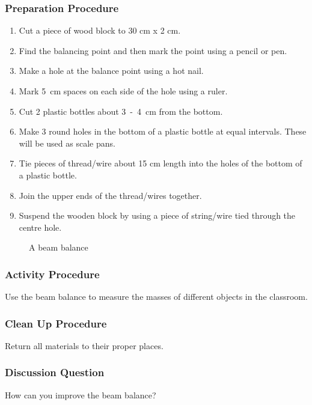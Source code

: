 \subsubsection*{Preparation Procedure}
\begin{enumerate}
\item{Cut a piece of wood block to 30 cm x 2 cm.} 
\item{Find the balancing point and then mark the point using a pencil or pen.} 
\item{Make a hole at the balance point using a hot nail.} 
\item{Mark 5~cm spaces on each side of the hole using a ruler.} 
\item{Cut 2 plastic bottles about 3~-~4~cm from the bottom.} 
\item{Make 3 round holes in the bottom of a plastic bottle at equal intervals. These will be used as scale pans.} 
\item{Tie pieces of thread/wire about 15 cm length into the holes of the bottom of a plastic bottle.} 
\item{Join the upper ends of the thread/wires together.} 
\item{Suspend the wooden block by using a piece of string/wire tied through the centre hole.} 
\end{enumerate}

\begin{figure}
\begin{center}
\def\svgwidth{350pt}

\caption{A beam balance}
\label{fig:beam-balance}
\end{center}
\end{figure}

\subsubsection*{Activity Procedure}
Use the beam balance to measure the masses of different objects in the classroom.

\subsubsection*{Clean Up Procedure}
Return all materials to their proper places.

\subsubsection*{Discussion Question}
How can you improve the beam balance?

